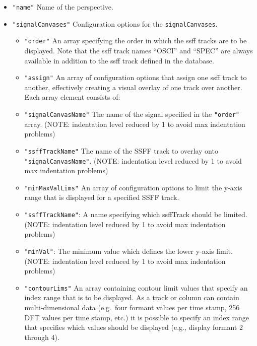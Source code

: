\documentclass[]{book}
\theoremstyle{definition}
\theoremstyle{definition}
\theoremstyle{definition}
\theoremstyle{remark}
\begin{document}
\begin{itemize}
\begin{itemize}
    \begin{itemize}
    \item
      \texttt{"name"} Name of the perspective.
    \item
      \texttt{"signalCanvases"} Configuration options for the
      \texttt{signalCanvases}.

      \begin{itemize}
      \item
        \texttt{"order"} An array specifying the order in which the
        {ssff} tracks are to be displayed. Note that the {ssff} track
        names ``OSCI'' and ``SPEC'' are always available in addition to
        the {ssff} track defined in the database.
      \item
        \texttt{"assign"} An array of configuration options that assign
        one {ssff} track to another, effectively creating a visual
        overlay of one track over another. Each array element consists
        of:
      \item
        \texttt{"signalCanvasName"} The name of the signal specified in
        the \texttt{"order"} array. (NOTE: indentation level reduced by
        1 to avoid max indentation problems)
      \item
        \texttt{"ssffTrackName"} The name of the SSFF track to overlay
        onto \texttt{"signalCanvasName"}. (NOTE: indentation level
        reduced by 1 to avoid max indentation problems)
      \item
        \texttt{"minMaxValLims"} An array of configuration options to
        limit the y-axis range that is displayed for a specified SSFF
        track.
      \item
        \texttt{"ssffTrackName"}: A name specifying which ssffTrack
        should be limited. (NOTE: indentation level reduced by 1 to
        avoid max indentation problems)
      \item
        \texttt{"minVal"}: The minimum value which defines the lower
        y-axis limit. (NOTE: indentation level reduced by 1 to avoid max
        indentation problems)
      \item
        \texttt{"contourLims"} An array containing contour limit values
        that specify an index range that is to be displayed. As a track
        or column can contain multi-dimensional data (e.g.~four formant
        values per time stamp, 256 DFT values per time stamp, etc.) it
        is possible to specify an index range that specifies which
        values should be displayed (e.g., display formant 2 through 4).

\end{itemize}
\end{itemize}
\end{itemize}
\end{itemize}
\end{document}
